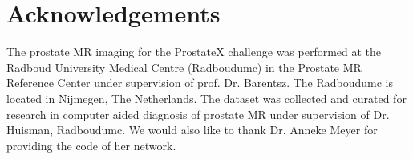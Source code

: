 \documentclass[num-refs]{wiley-article}
\begin{document}
\section{Acknowledgements}
The prostate MR imaging for the ProstateX challenge was performed at the Radboud University Medical Centre (Radboudumc) in the Prostate MR Reference Center under supervision of prof. Dr. Barentsz. The Radboudumc is located in Nijmegen, The Netherlands. The dataset was collected and curated for research in computer aided diagnosis of prostate MR under supervision of Dr. Huisman, Radboudumc. We would also like to thank Dr. Anneke Meyer for providing the code of her network.






\end{document}
